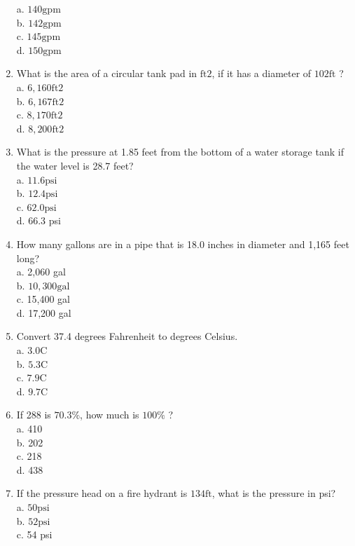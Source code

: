 \begin{enumerate}
a. $140 \mathrm{gpm}$\\
b. $142 \mathrm{gpm}$\\
c. $145 \mathrm{gpm}$\\
d. $150 \mathrm{gpm}$\\
\item What is the area of a circular tank pad in $\mathrm{ft} 2$, if it has a diameter of $102 \mathrm{ft}$ ?\\
a. $6,160 \mathrm{ft} 2$\\
b. $6,167 \mathrm{ft} 2$\\
c. $8,170 \mathrm{ft} 2$\\
d. $8,200 \mathrm{ft} 2$\\
\item What is the pressure at 1.85 feet from the bottom of a water storage tank if the water level is 28.7 feet?\\
a. $11.6 \mathrm{psi}$\\
b. $12.4 \mathrm{psi}$\\
c. $62.0 \mathrm{psi}$\\
d. 66.3 psi\\
\item How many gallons are in a pipe that is 18.0 inches in diameter and 1,165 feet long?\\
a. 2,060 gal\\
b. $10,300 \mathrm{gal}$\\
c. 15,400 gal\\
d. 17,200 gal\\
\item Convert 37.4 degrees Fahrenheit to degrees Celsius.\\
a. $3.0 \mathrm{C}$\\
b. $5.3 \mathrm{C}$\\
c. $7.9 \mathrm{C}$\\
d. $9.7 \mathrm{C}$\\
\item If 288 is $70.3 \%$, how much is $100 \%$ ?\\
a. 410\\
b. 202\\
c. 218\\
d. 438\\
\item If the pressure head on a fire hydrant is $134 \mathrm{ft}$, what is the pressure in psi?\\
a. $50 \mathrm{psi}$\\
b. $52 \mathrm{psi}$\\
c. 54 psi\\

\end{enumerate}
